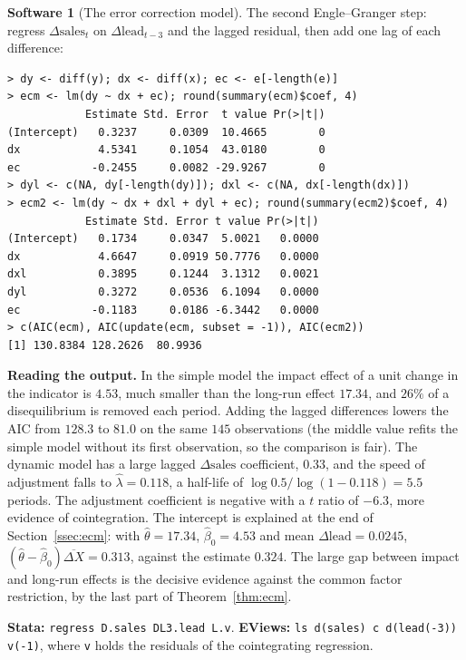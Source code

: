 \documentclass[11pt,a4paper]{article}
\numberwithin{equation}{section}
\theoremstyle{definition}
\newtheorem{software}[thm]{Software}
\begin{document}
\begin{software}[The error correction model]
\label{sw:ecm}
The second Engle--Granger step: regress $\Delta\text{sales}_t$ on $\Delta\text{lead}_{t-3}$ and the lagged residual, then add one lag of each difference:
{\small\begin{verbatim}
> dy <- diff(y); dx <- diff(x); ec <- e[-length(e)]
> ecm <- lm(dy ~ dx + ec); round(summary(ecm)$coef, 4)
            Estimate Std. Error  t value Pr(>|t|)
(Intercept)   0.3237     0.0309  10.4665        0
dx            4.5341     0.1054  43.0180        0
ec           -0.2455     0.0082 -29.9267        0
> dyl <- c(NA, dy[-length(dy)]); dxl <- c(NA, dx[-length(dx)])
> ecm2 <- lm(dy ~ dx + dxl + dyl + ec); round(summary(ecm2)$coef, 4)
            Estimate Std. Error t value Pr(>|t|)
(Intercept)   0.1734     0.0347  5.0021   0.0000
dx            4.6647     0.0919 50.7776   0.0000
dxl           0.3895     0.1244  3.1312   0.0021
dyl           0.3272     0.0536  6.1094   0.0000
ec           -0.1183     0.0186 -6.3442   0.0000
> c(AIC(ecm), AIC(update(ecm, subset = -1)), AIC(ecm2))
[1] 130.8384 128.2626  80.9936
\end{verbatim}}
\textbf{Reading the output.} In the simple model the impact effect of a unit change in the indicator is $4.53$, much smaller than the long-run effect $17.34$, and
$26\%$ of a disequilibrium is removed each period. Adding the lagged differences lowers the AIC from $128.3$ to $81.0$ on the same $145$ observations (the
middle value refits the simple model without its first observation, so the comparison is fair). The dynamic model has a large lagged $\Delta\text{sales}$
coefficient, $0.33$, and the speed of adjustment falls to $\hat\lambda = 0.118$, a half-life of $\log 0.5/\log(1 - 0.118) = 5.5$ periods. The adjustment coefficient is negative
with a $t$ ratio of $-6.3$, more evidence of cointegration. The intercept is explained at the end of Section~\ref{ssec:ecm}: with $\hat\theta = 17.34$, $\hat\beta_0 = 4.53$ and
mean $\Delta\text{lead} = 0.0245$, $(\hat\theta - \hat\beta_0)\overline{\Delta X} = 0.313$, against the estimate $0.324$. The large gap between impact and long-run effects is the
decisive evidence against the common factor restriction, by the last part of Theorem~\ref{thm:ecm}.

\textbf{Stata:} \texttt{regress D.sales DL3.lead L.v}. \textbf{EViews:} \texttt{ls d(sales) c d(lead(-3)) v(-1)}, where \texttt{v} holds the residuals of the
cointegrating regression.
\end{software}
\end{document}
